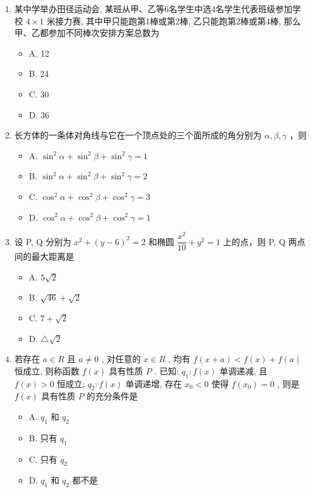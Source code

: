 \documentclass[UTF8,11pt,a4paper]{ctexart}
\providecommand{\tightlist}{%
  \setlength{\itemsep}{0pt}\setlength{\parskip}{0pt}}
\begin{document}
\begin{enumerate}
\def\labelenumi{\arabic{enumi}.}
\setcounter{enumi}{4}
\item
  某中学举办田径运动会, 某班从甲、乙等6名学生中选4名学生代表班级参加学校 \(4 \times 1\) 米接力赛, 其中甲只能跑第1棒或第2棒, 乙只能跑第2棒或第4棒, 那么甲、乙都参加不同棒次安排方案总数为

  \begin{itemize}
  \tightlist
  \item
    A. 12
  \item
    B. 24
  \item
    C. 30
  \item
    D. 36
  \end{itemize}
\item
  长方体的一条体对角线与它在一个顶点处的三个面所成的角分别为 \(\alpha, \beta, \gamma\) ，则

  \begin{itemize}
  \tightlist
  \item
    A. \(\sin^2\alpha + \sin^2\beta + \sin^2\gamma = 1\)
  \item
    B. \(\sin^2\alpha + \sin^2\beta + \sin^2\gamma = 2\)
  \item
    C. \(\cos^2\alpha + \cos^2\beta + \cos^2\gamma = 3\)
  \item
    D. \(\cos^2\alpha + \cos^2\beta + \cos^2\gamma = 1\)
  \end{itemize}
\item
  设 P, Q 分别为 \(x^{2} + (y - 6)^{2} = 2\) 和椭圆 \(\dfrac{x^{2}}{10} + y^{2} = 1\) 上的点，则 P, Q 两点间的最大距离是

  \begin{itemize}
  \tightlist
  \item
    A. \(5\sqrt{2}\)
  \item
    B. \(\sqrt{46} + \sqrt{2}\)
  \item
    C. \(7 + \sqrt{2}\)
  \item
    D. \(\triangle\sqrt{2}\)
  \end{itemize}
\item
  若存在 \(a \in R\) 且 \(a \neq 0\) , 对任意的 \(x \in R\) , 均有 \(f(x + a) < f(x) + f(a)\) 恒成立, 则称函数 \(f(x)\) 具有性质 \(P\) . 已知: \(q_{1}: f(x)\) 单调递减, 且 \(f(x) > 0\) 恒成立; \(q_{2}: f(x)\) 单调递增, 存在 \(x_{0} < 0\) 使得 \(f(x_{0}) = 0\) , 则是 \(f(x)\) 具有性质 \(P\) 的充分条件是

  \begin{itemize}
  \tightlist
  \item
    A. \(q_{1}\) 和 \(q_{2}\)
  \item
    B. 只有 \(q_{1}\)
  \item
    C. 只有 \(q_{2}\)
  \item
    D. \(q_{1}\) 和 \(q_{2}\) 都不是
  \end{itemize}
\end{enumerate}
\end{document}
